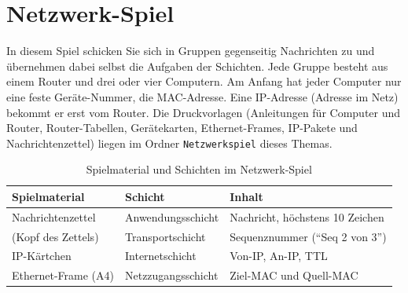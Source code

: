 \chapter{Netzwerk-Spiel}
\label{chapter:netzwerkspiel}

In diesem Spiel schicken Sie sich in Gruppen gegenseitig Nachrichten zu und übernehmen dabei selbst die Aufgaben der Schichten. Jede Gruppe besteht aus einem Router und drei oder vier Computern. Am Anfang hat jeder Computer nur eine feste Geräte-Nummer, die \gls{MAC}-Adresse. Eine \gls{IP}-Adresse (Adresse im Netz) bekommt er erst vom Router. Die Druckvorlagen (Anleitungen für Computer und Router, Router-Tabellen, Gerätekarten, Ethernet-Frames, IP-Pakete und Nachrichtenzettel) liegen im Ordner \texttt{Netzwerkspiel} dieses Themas.

\begin{table}[H]
	\centering
	\small
	\begin{tabular}{p{4cm}p{4.2cm}p{5.6cm}}
		Spielmaterial & Schicht & Inhalt \\\midrule
		Nachrichtenzettel & Anwendungsschicht & Nachricht, höchstens 10 Zeichen \\
		(Kopf des Zettels) & Transportschicht & Sequenznummer (\enquote{Seq 2 von 3}) \\
		IP-Kärtchen & Internetschicht & Von-\acrshort{IP}, An-\acrshort{IP}, TTL \\
		Ethernet-Frame (A4) & Netzzugangsschicht & Ziel-\acrshort{MAC} und Quell-\acrshort{MAC} \\
	\end{tabular}
	\caption{Spielmaterial und Schichten im Netzwerk-Spiel}
\end{table}

